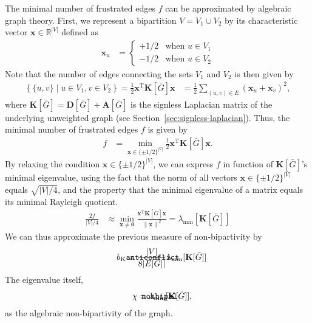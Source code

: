 \documentclass{article}
\def\mathnote#1{%
  \tag*{\rlap{\hspace\marginparsep\smash{\parbox[t]{\marginparwidth}{#1}}}}
}
\begin{document}
The minimal number of frustrated edges $f$ can be approximated by
algebraic graph theory.  First, we represent a bipartition $V = V_1 \cup
V_2$ by its characteristic vector $\mathbf x \in \mathbb R^{|V|}$
defined as
\begin{align*}
  \mathbf x_u &= \left\{ \begin{array}{ll} +1/2 & \text{when $u \in
      V_1$} \\ -1/2 & \text{when $u \in V_2$}
    \end{array} \right. 
\end{align*}
Note that the number of edges connecting the sets $V_1$ and $V_2$ is
then given by
\begin{align*}
\left\{ \{u,v\} \mid u \in V_1, v \in V_2 \right\} = \frac 12 \mathbf
x^{\mathrm T} \mathbf K[\bar G] \mathbf x &= \frac 12 \sum_{(u,v) \in E}
(\mathbf x_u + \mathbf x_v)^2,
\end{align*}
where $\mathbf K[\bar G] = \mathbf D[\bar G] + \mathbf A[\bar G]$ is the
signless Laplacian matrix of the underlying unweighted graph (see
Section~\ref{sec:signless-laplacian}).  Thus, the 
minimal number of frustrated edges $f$ is given by
\begin{align*}
  f &= \min_{\mathbf x \in \{\pm 1/2\}^{|V|}} \frac 12 \mathbf
  x^{\mathrm T} \mathbf K[\bar G] \mathbf x.
\end{align*}
By relaxing the condition $\mathbf x \in \{\pm 1/2\}^{|V|}$, we can
express $f$ in function of $\mathbf K[\bar G]$'s minimal eigenvalue,
using the fact that the norm of all vectors $\mathbf x \in \{\pm
1/2\}^{|V|}$ equals $\sqrt{|V|/4}$, and the property that the minimal
eigenvalue of a matrix equals its minimal Rayleigh quotient.
\begin{align*}
  \frac {2f} {|V|/4} &\approx \min_{\mathbf x \neq \mathbf 0} \frac
        {\mathbf x^{\mathrm T} \mathbf K[\bar G] \mathbf x} {\left\|
          \mathbf x \right\|^2} = \lambda_{\min}[\mathbf K[\bar G]]
\end{align*}
We can thus approximate the previous measure of non-bipartivity by
\begin{align}
  \mathnote{\texttt{anticonflict}} b_{\mathrm K} &= \frac {|V|} {8 |E[\bar
      G]|} \lambda_{\min}[\mathbf K[\bar G]]
\end{align}
The eigenvalue itself,
\begin{align}
  \mathnote{\texttt{nonbipal}}
  \chi &= \lambda_{\min}[\mathbf K[\bar G]],
\end{align}
as the algebraic non-bipartivity of the graph. 
\end{document}
